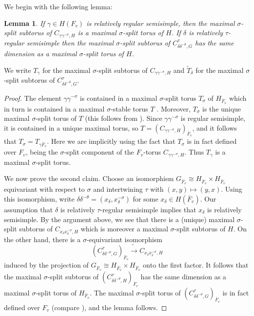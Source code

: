 \documentclass[12pt]{amsart}
\newtheorem{lem}[thm]{Lemma}
\theoremstyle{remark}
\numberwithin{equation}{section}
\newcommand{\lto}{\longrightarrow}
\theoremstyle{definition}
\renewcommand{\bar}{\overline}
\numberwithin{equation}{subsection}
\begin{document}
 We begin with the following lemma:
\begin{lem} \label{lem-tdelta} If
$\gamma \in H(F_v)$ is relatively regular semisimple, then the maximal $\sigma$-split subtorus of
$C_{\gamma\gamma^{-\sigma},H}$ is a maximal $\sigma$-split torus of $H$.  If
 $\delta$ is relatively $\tau$-regular semisimple then the maximal $\sigma$-split subtorus of $C_{\delta\delta^{-\theta},G}^{\tau}$ has the same dimension
 as a maximal $\sigma$-split torus of $H$.
\end{lem}
\noindent We write $T_{\gamma}$  for the maximal $\sigma$-split subtorus of $C_{\gamma\gamma^{-\sigma},H}$
and $\widetilde{T}_{\delta}$  for the maximal $\sigma$-split subtorus of $C_{\delta\delta^{-\theta},G}^{\tau}$.
\begin{proof}
The element $\gamma\gamma^{-\sigma}$ is contained in a maximal $\sigma$-split torus $T_{\sigma}$ of $H_{\bar{F}_v}$ \cite[Theorem 7.5]{Rich} which in turn is contained in a maximal $\sigma$-stable torus $T$
\cite[Proposition 1.4]{Helmtori}.  Moreover, $T_{\sigma}$ is the unique maximal $\sigma$-split torus of $T$ (this follows from \cite[Theorem 7.5]{Rich}).
 Since $\gamma\gamma^{-\sigma}$ is regular semisimple, it is contained in a unique maximal torus, so $T=(C_{\gamma\gamma^{-\sigma},H})_{\bar{F}_v}$,
 and it follows that $T_{\sigma}=T_{\gamma \bar{F}_v}$.  Here we are implicitly using the fact that $T_{\sigma}$ is in fact defined over $F_v$, being the $\sigma$-split component of the $F_v$-torus $C_{\gamma\gamma^{-\sigma},H}$.  Thus $T_{\gamma}$ is a maximal $\sigma$-split torus.

We now prove the second claim.  Choose an isomorphism $G_{\bar{F}_v} \cong H_{\bar{F}_v} \times H_{\bar{F}_v}$ equivariant with respect to $\sigma$ and intertwining $\tau$ with $(x,y) \mapsto (y,x)$.  Using this isomorphism, write $\delta \delta^{-\theta}=(x_{\delta},x_{\delta}^{-\sigma})$ for some $x_{\delta} \in H(\bar{F}_v)$.  Our assumption that $\delta$ is relatively $\tau$-regular semisimple implies that $x_{\delta}$ is relatively semisimple.  By the argument above, we see that there is a (unique) maximal $\sigma$-split subtorus of $C_{x_{\delta}x_{\delta}^{-\sigma},H}$ which is moreover a maximal $\sigma$-split subtorus of $H$.  On the other hand, there is a $\sigma$-equivariant isomorphism
$$
(C_{\delta \delta^{-\theta},G}^{\tau})_{\bar{F}_v} \tilde{\lto} C_{x_{\delta}x_{\delta}^{-\sigma},H}
$$
induced by the projection of $G_{\bar{F}_v} \cong H_{\bar{F}_v} \times H_{\bar{F}_v}$ onto the first factor.  It follows that the maximal $\sigma$-split subtorus of $(C^{\tau}_{\delta \delta^{-\theta},H})_{\bar{F}_v}$ has the same dimension as a maximal $\sigma$-split torus of $H_{\bar{F}_v}$.  The maximal $\sigma$-split torus of $(C^{\tau}_{\delta \delta^{-\theta},G})_{\bar{F}_v}$ is in fact defined over $F_v$ (compare \cite[\S 1.3]{Helmtori}), and the lemma follows.
\end{proof}
\end{document}
